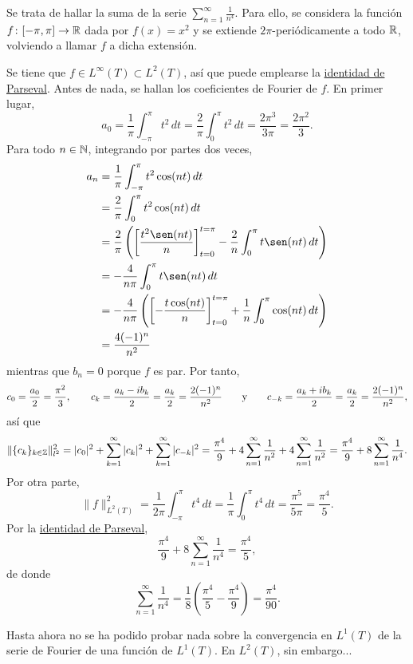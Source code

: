 \documentclass[a4paper, 11pt, oneside]{report}
\begin{document}
\begin{example}
  Se trata de hallar la suma de la serie $\sum_{n=1}^\infty \frac{1}{n^4}$. Para ello, se considera la función $f \colon [-\pi,\pi] \to \mathbb R$ dada por $f(x)=x^2$ y se extiende $2\pi$-periódicamente a todo $\mathbb R$, volviendo a llamar $f$ a dicha extensión.

  Se tiene que $f \in L^\infty(T) \subset L^2(T)$, así que puede emplearse la \hyperref[teo:4.5.1]{\color{c1}identidad de Parseval}. Antes de nada, se hallan los coeficientes de Fourier de $f$. En primer lugar,
  \[a_0 = \frac{1}{\pi}\int_{-\pi}^\pi t^2\, dt = \frac{2}{\pi}\int_0^\pi t^2\, dt = \frac{2\pi^3}{3\pi}  = \frac{2\pi^2}{3}.\]
  Para todo $n \in \mathbb N$, integrando por partes dos veces,
  \begin{align*}
    a_n &= \frac{1}{\pi}\int_{-\pi}^\pi t^2\cos(nt) \, dt  \\
    &= \frac{2}{\pi}\int_0^\pi t^2\cos(nt) \, dt \\
    &= \frac{2}{\pi}\left(\left[\frac{t^2\sen(nt)}{n}\right]_{t=0}^{t=\pi}-\frac{2}{n}\int_0^\pi t\sen(nt) \, dt\right) \\
    &= -\frac{4}{n\pi} \int_0^\pi t\sen(nt) \, dt \\
    &= -\frac{4}{n\pi}\left(\left[-\frac{t\cos(nt)}{n}\right]_{t=0}^{t = \pi} + \frac{1}{n}\int_0^\pi \cos(nt)\, dt\right) \\
    &= \frac{4(-1)^n}{n^2}
  \end{align*}
  mientras que $b_n = 0$ porque $f$ es par. Por tanto, \[c_0 = \frac{a_0}{2} = \frac{\pi^2}{3}, \qquad c_k = \frac{a_k-ib_k}{2} = \frac{a_k}{2} = \frac{2(-1)^n}{n^2} \qquad \textup{y} \qquad c_{-k} = \frac{a_k+ib_k}{2} = \frac{a_k}{2} = \frac{2(-1)^n}{n^2},\]
  así que
  \[\|\{c_k\}_{k \in \mathbb Z}\|_{l^2}^2 = |c_0|^2+\sum_{k=1}^\infty |c_k|^2 + \sum_{k=1}^\infty |c_{-k}|^2 = \frac{\pi^4}{9}+4\sum_{n=1}^\infty \frac{1}{n^2} + 4\sum_{n=1}^\infty \frac{1}{n^2} = \frac{\pi^4}{9}+8\sum_{n=1}^\infty\frac{1}{n^4}. \]
  Por otra parte, 
  \[\|f\|_{L^2(T)}^2 = \frac{1}{2\pi}\int_{-\pi}^\pi t^4\, dt = \frac{1}{\pi}\int_0^\pi t^4 \, dt = \frac{\pi^5}{5\pi} = \frac{\pi^4}{5}.\]
  Por la \hyperref[teo:4.5.1]{\color{c1}identidad de Parseval},
  \[\frac{\pi^4}{9}+8\sum_{n=1}^\infty \frac{1}{n^4} = \frac{\pi^4}{5},\]
  de donde
  \[\sum_{n=1}^\infty \frac{1}{n^4} =\frac{1}{8}\left( \frac{\pi^4}{5} - \frac{\pi^4}{9}\right) = \frac{\pi^4}{90}.\]
\end{example}

Hasta ahora no se ha podido probar nada sobre la convergencia en $L^1(T)$ de la serie de Fourier de una función de $L^1(T)$. En $L^2(T)$, sin embargo...
\end{document}
